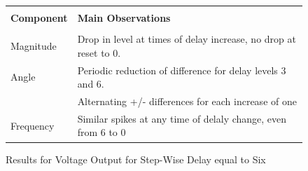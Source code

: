 \begin{figure}[H]
\begin{tabular}{c}
 
  \end{tabular}
\caption{Results for Voltage Output for Step-Wise Delay equal to Six }
  \begin{tabular}{p{2cm} p{\textwidth-2cm}}
   & \\
  \textbf{Component} & \textbf{Main Observations} \\
    & \\
      Magnitude  & Drop in level at times of delay increase, no drop at reset to 0. \\
     Angle  &  Periodic reduction of difference for delay levels 3 and 6. \\
                & Alternating +/- differences for each increase of one \\
Frequency &  Similar spikes at any time of delaly change, even from 6 to 0
  \end{tabular}
\label{fig:VoltageStepWiseDelaySix}

\end{figure}

